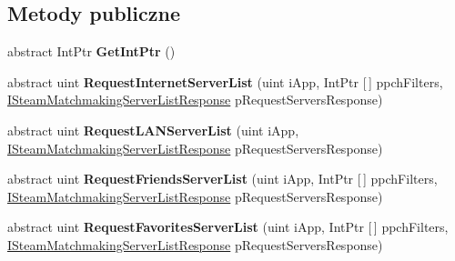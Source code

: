 \subsection*{Metody publiczne}
\begin{DoxyCompactItemize}
\item 
\mbox{\label{class_valve_1_1_steamworks_1_1_i_steam_matchmaking_servers_a2f5de65cbe2bf5b8c505a4028e4d434c}} 
abstract Int\+Ptr {\bfseries Get\+Int\+Ptr} ()
\item 
\mbox{\label{class_valve_1_1_steamworks_1_1_i_steam_matchmaking_servers_a523666f5a8608fcc02a019dbc05291c3}} 
abstract uint {\bfseries Request\+Internet\+Server\+List} (uint i\+App, Int\+Ptr \mbox{[}$\,$\mbox{]} ppch\+Filters, \hyperlink{class_valve_1_1_steamworks_1_1_i_steam_matchmaking_server_list_response}{I\+Steam\+Matchmaking\+Server\+List\+Response} p\+Request\+Servers\+Response)
\item 
\mbox{\label{class_valve_1_1_steamworks_1_1_i_steam_matchmaking_servers_a498b47951bb43593c6990f54f7f48d7d}} 
abstract uint {\bfseries Request\+L\+A\+N\+Server\+List} (uint i\+App, \hyperlink{class_valve_1_1_steamworks_1_1_i_steam_matchmaking_server_list_response}{I\+Steam\+Matchmaking\+Server\+List\+Response} p\+Request\+Servers\+Response)
\item 
\mbox{\label{class_valve_1_1_steamworks_1_1_i_steam_matchmaking_servers_a2ffa792dbc305b7094a2aa651deb72b4}} 
abstract uint {\bfseries Request\+Friends\+Server\+List} (uint i\+App, Int\+Ptr \mbox{[}$\,$\mbox{]} ppch\+Filters, \hyperlink{class_valve_1_1_steamworks_1_1_i_steam_matchmaking_server_list_response}{I\+Steam\+Matchmaking\+Server\+List\+Response} p\+Request\+Servers\+Response)
\item 
\mbox{\label{class_valve_1_1_steamworks_1_1_i_steam_matchmaking_servers_a53aa9eb87c5b546b70ff4b5e0ccfbb3a}} 
abstract uint {\bfseries Request\+Favorites\+Server\+List} (uint i\+App, Int\+Ptr \mbox{[}$\,$\mbox{]} ppch\+Filters, \hyperlink{class_valve_1_1_steamworks_1_1_i_steam_matchmaking_server_list_response}{I\+Steam\+Matchmaking\+Server\+List\+Response} p\+Request\+Servers\+Response)

\end{DoxyCompactItemize}
